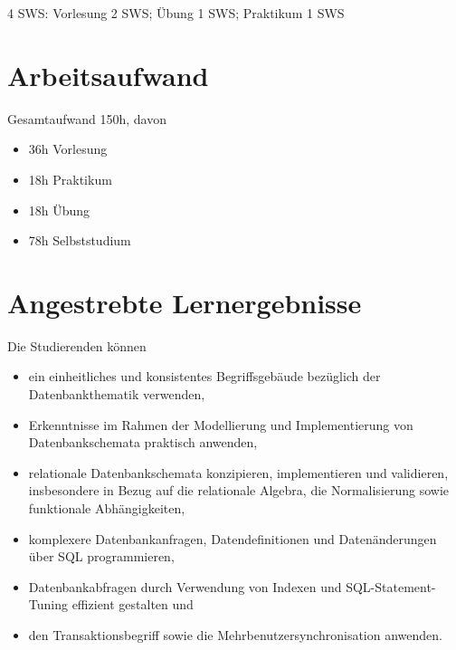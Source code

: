 4 SWS: Vorlesung 2 SWS; Übung 1 SWS; Praktikum 1 SWS

\hypertarget{arbeitsaufwandpathlabelmi-2017modulbeschreibungen-bachelorba_datenbanken1}{%
\section*{Arbeitsaufwand\label{/mi-2017/modulbeschreibungen-bachelor/BA_Datenbanken1}}\label{arbeitsaufwandpathlabelmi-2017modulbeschreibungen-bachelorba_datenbanken1}}

Gesamtaufwand 150h, davon

\begin{itemize}
\tightlist
\item
  36h Vorlesung
\item
  18h Praktikum
\item
  18h Übung
\item
  78h Selbststudium
\end{itemize}

\hypertarget{angestrebte-lernergebnissepathlabelmi-2017modulbeschreibungen-bachelorba_datenbanken1}{%
\section*{Angestrebte
Lernergebnisse\label{/mi-2017/modulbeschreibungen-bachelor/BA_Datenbanken1}}\label{angestrebte-lernergebnissepathlabelmi-2017modulbeschreibungen-bachelorba_datenbanken1}}

Die Studierenden können

\begin{itemize}
\tightlist
\item
  ein einheitliches und konsistentes Begriffsgebäude bezüglich der
  Datenbankthematik verwenden,
\item
  Erkenntnisse im Rahmen der Modellierung und Implementierung von
  Datenbankschemata praktisch anwenden,
\item
  relationale Datenbankschemata konzipieren, implementieren und
  validieren, insbesondere in Bezug auf die relationale Algebra, die
  Normalisierung sowie funktionale Abhängigkeiten,
\item
  komplexere Datenbankanfragen, Datendefinitionen und Datenänderungen
  über SQL programmieren,~
\item
  Datenbankabfragen durch Verwendung von Indexen und
  SQL-Statement-Tuning effizient gestalten und
\item
  den Transaktionsbegriff sowie die Mehrbenutzersynchronisation
  anwenden.
\end{itemize}

